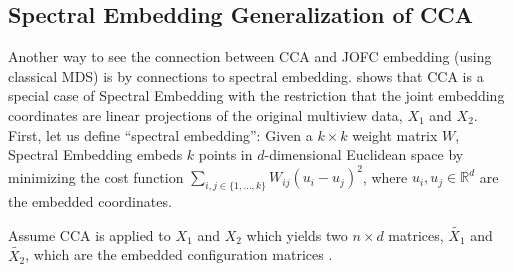\documentclass[12pt,oneside,final]{thesis}\usepackage[]{graphicx}\usepackage[]{color}
\begin{document}
\subsection{Spectral Embedding Generalization of CCA}

Another way to see the connection between CCA and JOFC embedding (using classical MDS) is by connections to spectral embedding. \cite{CCAviaSpectralEmbed} shows that CCA is a special case of Spectral Embedding with the restriction that the joint embedding coordinates are linear projections of the original multiview data, $X_1$ and $X_2$. First, let us define ``spectral embedding'':
Given  a $k \times k$ weight matrix $W$, Spectral Embedding embeds $k$ points in $d$-dimensional Euclidean space by  minimizing the cost function $\sum_{i,j \in \{1,\ldots,k\}}W_{ij}\left(u_i-u_j\right)^2$, where $u_i, u_j \in \mathbb{R}^d$ are the embedded coordinates.

Assume CCA is applied to $X_1$ and $X_2$ which yields two  $n \times d$ matrices, $\tilde{X_1}$ and $\tilde{X_2}$,  which are the embedded configuration matrices . 
\end{document}
